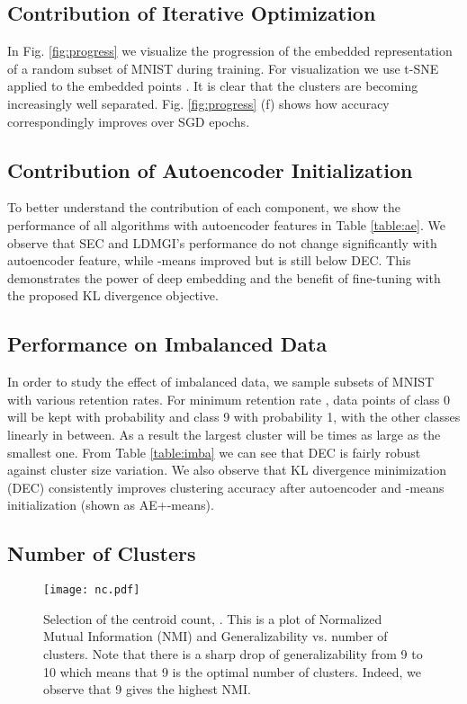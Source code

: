 \documentclass{article}
\begin{document}
\subsection{Contribution of Iterative Optimization}


In Fig. \ref{fig:progress} we visualize the progression of the embedded representation of a random subset of MNIST during training.
For visualization we use t-SNE~\citep{van2008visualizing} applied to the embedded points .
It is clear that the clusters are becoming increasingly well separated.
Fig. \ref{fig:progress}  (f) shows how accuracy correspondingly improves over SGD epochs.

\subsection{Contribution of Autoencoder Initialization}
To better understand the contribution of each component, we show the performance of all algorithms with autoencoder features in Table \ref{table:ae}.
We observe that SEC and LDMGI's performance do not change significantly with autoencoder feature, while -means improved but is still below DEC.
This demonstrates the power of deep embedding and the benefit of fine-tuning with the proposed KL divergence objective.

\subsection{Performance on Imbalanced Data}
In order to study the effect of imbalanced data, we sample subsets of MNIST with various retention rates.
For minimum retention rate , data points of class 0 will be kept with probability  and class 9 with probability 1, with the other classes linearly in between.
As a result the largest cluster will be  times as large as the smallest one. 
From Table \ref{table:imba} we can see that DEC is fairly robust against cluster size variation.
We also observe that KL divergence minimization (DEC) consistently improves clustering accuracy after autoencoder and -means initialization (shown as AE+-means).

\subsection{Number of Clusters}
\begin{figure}[!h]
\centering
\texttt{[image: nc.pdf]}
\caption{Selection of the centroid count, .
This is a plot of Normalized Mutual Information (NMI) and Generalizability vs. number of clusters.
Note that there is a sharp drop of generalizability from 9 to 10 which means that 9 is the optimal number of clusters.
Indeed, we observe that 9 gives the highest NMI.}
\label{fig:nc}
\end{figure}
\end{document}
